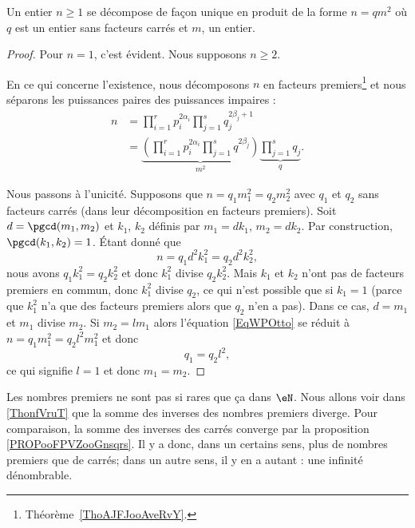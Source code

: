 \begin{lemma}   \label{LemheKdsa}
	Un entier \( n\geq 1\) se décompose de façon unique en produit de la forme \( n=qm^2\) où \( q\) est un entier sans facteurs carrés et \( m\), un entier.
\end{lemma}

\begin{proof}
	Pour \( n=1\), c'est évident. Nous supposons \( n\geq 2\).

	En ce qui concerne l'existence, nous décomposons \( n\) en facteurs premiers\footnote{Théorème~\ref{ThoAJFJooAveRvY}.} et nous séparons les puissances paires des puissances impaires :
	\begin{subequations}
		\begin{align}
			n & = \prod_{i=1}^r p_i^{2\alpha_i}\prod_{j=1}^sq_{j}^{2\beta_j+1}                                                              \\
			  & = \underbrace{\left( \prod_{i=1}^rp_i^{2\alpha_i}\prod_{j=1}^sq^{2\beta_j} \right)}_{m^2}\underbrace{\prod_{j=1}^sq_j}_{q}.
		\end{align}
	\end{subequations}

	Nous passons à l'unicité. Supposons que \( n=q_1m_1^2=q_2m_2^2\) avec \( q_1\) et \( q_2\) sans facteurs carrés (dans leur décomposition en facteurs premiers). Soit \( d=\pgcd(m_1,m_2)\) et \( k_1\), \( k_2\) définis par \( m_1=dk_1\), \( m_2=dk_2\). Par construction, \( \pgcd(k_1,k_2)=1\). Étant donné que
	\begin{equation}        \label{EqWPOtto}
		n=q_1d^2k_1^2=q_2d^2k_2^2,
	\end{equation}
	nous avons \( q_1k_1^2=q_2k_2^2\) et donc \( k_1^2\) divise \( q_2k_2^2\). Mais \( k_1\) et \( k_2\) n'ont pas de facteurs premiers en commun, donc \( k_1^2\) divise \( q_2\), ce qui n'est possible que si \( k_1=1\) (parce que \( k_1^2\) n'a que des facteurs premiers alors que \( q_2\) n'en a pas). Dans ce cas, \( d=m_1\) et \( m_1\) divise \( m_2\). Si \( m_2=lm_1\) alors l'équation \eqref{EqWPOtto} se réduit à  \( n=q_1m_1^2=q_2l^2m_1^2\) et donc
	\begin{equation}
		q_1=q_2l^2,
	\end{equation}
	ce qui signifie \( l=1\) et donc \( m_1=m_2\).
\end{proof}

Les nombres premiers ne sont pas si rares que ça dans \( \eN\). Nous allons voir dans \ref{ThonfVruT} que la somme des inverses des nombres premiers diverge. Pour comparaison, la somme des inverses des carrés converge par la proposition \ref{PROPooFPVZooGnsqrs}. Il y a donc, dans un certains sens, plus de nombres premiers que de carrés; dans un autre sens, il y en a autant : une infinité dénombrable.


